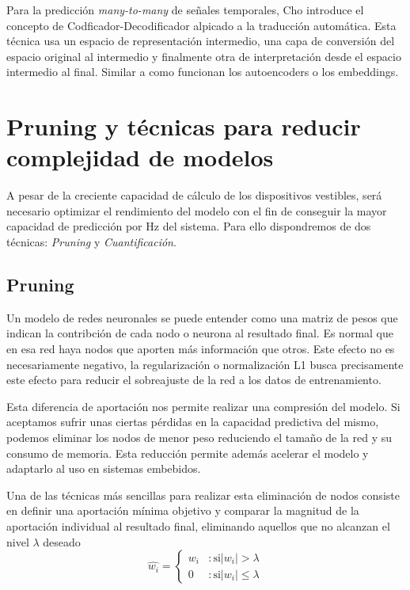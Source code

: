 \documentclass[../tfm.tex]{subfiles}
\begin{document}
Para la predicción \textit{many-to-many} de señales temporales, Cho \cite{cho2014} introduce el concepto de Codficador-Decodificador alpicado a la traducción automática. Esta técnica usa un espacio de representación intermedio, una capa de conversión del espacio original al intermedio y finalmente otra de interpretación desde el espacio intermedio al final. Similar a como funcionan los autoencoders o los embeddings.

\section{Pruning y técnicas para reducir complejidad de modelos}\label{sa_optimizacion}

A pesar de la creciente capacidad de cálculo de los dispositivos vestibles, será necesario optimizar el rendimiento del modelo con el fin de conseguir la mayor capacidad de predicción por Hz del sistema. Para ello dispondremos de dos técnicas: \textit{Pruning} y \textit{Cuantificación}.

\subsection{Pruning}
Un modelo de redes neuronales se puede entender como una matriz de pesos que indican la contribción de cada nodo o neurona al resultado final. Es normal que en esa red haya nodos que aporten más información que otros. Este efecto no es necesariamente negativo, la regularización o normalización L1 busca precisamente este efecto para reducir el sobreajuste de la red a los datos de entrenamiento.

Esta diferencia de aportación nos permite realizar una compresión del modelo. Si aceptamos sufrir unas ciertas pérdidas en la capacidad predictiva del mismo, podemos eliminar los nodos de menor peso reduciendo el tamaño de la red y su consumo de memoria. Esta reducción permite además acelerar el modelo y adaptarlo al uso en sistemas embebidos.


Una de las técnicas más sencillas para realizar esta eliminación de nodos consiste en definir una aportación mínima objetivo y comparar la magnitud de la aportación individual al resultado final, eliminando aquellos que no alcanzan el nivel $\lambda$ deseado
\[
\hat{w_i} = \left\{ \begin{matrix} w_i & :\mbox{si} |w_i|>\lambda\\
  0 & :\mbox{si} |w_i|\leq\lambda\end{matrix} \right.
\]
\end{document}
